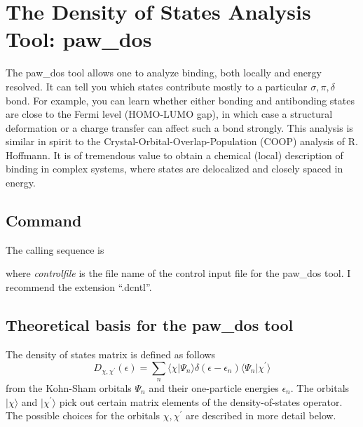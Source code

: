 \documentclass[final,12pt,makeidx,DIV=calc]{article}
\begin{document}
{{{{{{%
\newpage
\section{The Density of States Analysis Tool: paw\_dos}
The paw\_dos tool allows one to analyze binding, both locally and energy
resolved. It can tell you which states contribute mostly to a
particular $\sigma, \pi, \delta$ bond. For example, you can learn whether
either bonding and antibonding states are close to the Fermi level
(HOMO-LUMO gap), in which case a structural deformation or a charge
transfer can affect such a bond strongly. This analysis is similar in
spirit to the Crystal-Orbital-Overlap-Population (COOP) analysis of R.
Hoffmann. It is of tremendous value to obtain a chemical (local)
description of binding in complex systems, where states are
delocalized and closely spaced in energy.

\subsection{Command}

The calling sequence is

\bigskip{}\bigskip

\noindent
where {\it controlfile} is the file name of the control input file for
the paw\_dos tool. I recommend the extension ``.dcntl''.


\subsection{Theoretical basis for the paw\_dos tool}

The density of states matrix is defined as follows
\begin{equation}
  D_{\chi,\chi^\prime}(\epsilon)
 =\sum_n
  \langle\chi|\Psi_n\rangle
\delta(\epsilon-\epsilon_n)
\langle\Psi_n|\chi^\prime\rangle
\end{equation}
from the Kohn-Sham orbitals $\Psi_n$ and their one-particle energies
$\epsilon_n$. The orbitals $|\chi\rangle$ and $|\chi^\prime\rangle$
pick out certain matrix elements of the density-of-states
operator. The possible choices for the orbitals $\chi,\chi^\prime$ are
described in more detail below.

}}}}}}
\end{document}
